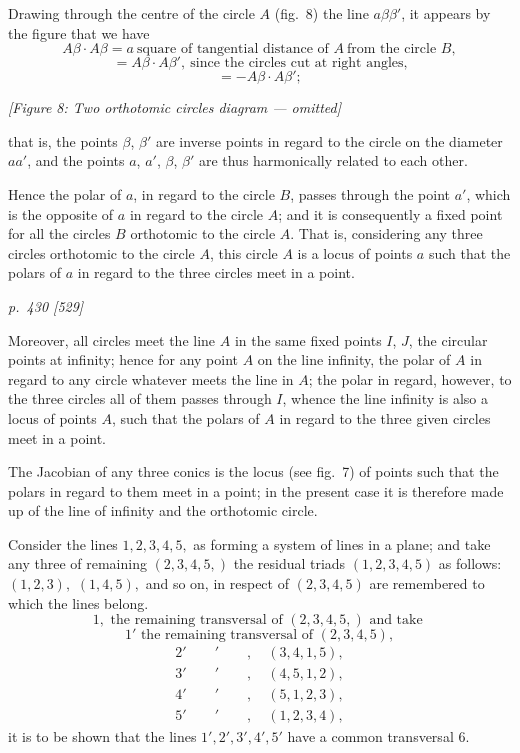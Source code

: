 \documentclass[11pt,a4paper]{book}
\begin{document}
Drawing through the centre of the circle $A$ (fig.~8) the line $a\beta\beta'$, it appears by
the figure that we have
\[
A\beta\cdot A\beta = a\ \text{square of tangential distance of }A\ \text{from the circle }B,
\]
\[
= A\beta\cdot A\beta',\ \text{since the circles cut at right angles,}
\]
\[
= -A\beta\cdot A\beta';
\]

\begin{center}
\textit{[Figure 8: Two orthotomic circles diagram --- omitted]}
\end{center}

\noindent
that is, the points $\beta$, $\beta'$ are inverse points in regard to the circle on the diameter $aa'$,
and the points $a$, $a'$, $\beta$, $\beta'$ are thus harmonically related to each other.

Hence the polar of $a$, in regard to the circle $B$, passes through the point $a'$,
which is the opposite of $a$ in regard to the circle $A$; and it is consequently a fixed point for
all the circles $B$ orthotomic to the circle $A$. That is, considering any three circles
orthotomic to the circle $A$, this circle $A$ is a locus of points $a$ such that the polars
of $a$ in regard to the three circles meet in a point.

\clearpage

\bigskip
\textit{p.~430 [529]}
\smallskip

Moreover, all circles meet the line $A$ in the same fixed points $I$, $J$, the circular
points at infinity; hence for any point $A$ on the line infinity, the polar of $A$ in regard
to any circle whatever meets the line in $A$; the polar in regard, however, to the three
circles all of them passes through $I$, whence the line infinity is also a locus of points $A$,
such that the polars of $A$ in regard to the three given circles meet in a point.

The Jacobian of any three conics is the locus (see fig.~7) of points such that the
polars in regard to them meet in a point; in the present case it is therefore made up of
the line of infinity and the orthotomic circle.

Consider the lines $1, 2, 3, 4, 5,$ as forming a system of lines in a plane;
and take any three of remaining $(2, 3, 4, 5,)$ the residual triads $(1,2,3,4,5)$ as follows: $(1, 2,3),$ $(1,4,5),$ and so on, in respect of $(2, 3, 4, 5)$ are remembered to which the lines belong.
\[
1, \text{ the remaining transversal of } (2,3,4,5,) \text{ and take }
\]
\[
1' \text{ the remaining transversal of } (2,3,4,5),
\]
\[
\begin{array}{l}
2'\quad\quad \prime\quad\quad ,\quad (3,4,1,5),\\
3'\quad\quad \prime\quad\quad ,\quad (4,5,1,2),\\
4'\quad\quad \prime\quad\quad ,\quad (5,1,2,3),\\
5'\quad\quad \prime\quad\quad ,\quad (1,2,3,4),
\end{array}
\]
it is to be shown that the lines $1', 2', 3', 4', 5'$ have a common transversal $6$.
\end{document}
